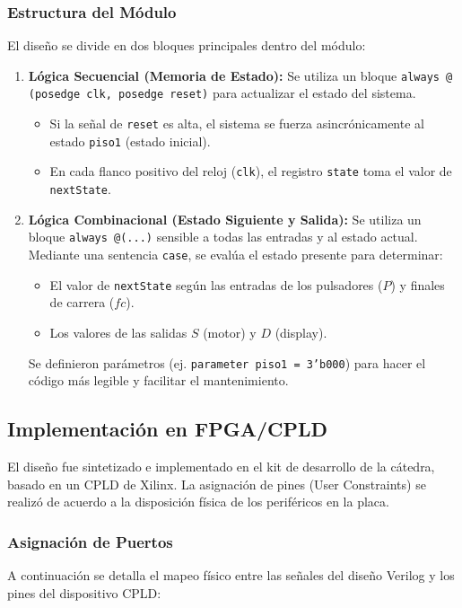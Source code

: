 \subsubsection{Estructura del Módulo}
El diseño se divide en dos bloques principales dentro del módulo:

\begin{enumerate}
    \item \textbf{Lógica Secuencial (Memoria de Estado):}
    Se utiliza un bloque \texttt{always @ (posedge clk, posedge reset)} para actualizar el estado del sistema.
    \begin{itemize}
        \item Si la señal de \texttt{reset} es alta, el sistema se fuerza asincrónicamente al estado \texttt{piso1} (estado inicial).
        \item En cada flanco positivo del reloj (\texttt{clk}), el registro \texttt{state} toma el valor de \texttt{nextState}.
    \end{itemize}

    \item \textbf{Lógica Combinacional (Estado Siguiente y Salida):}
    Se utiliza un bloque \texttt{always @(...)} sensible a todas las entradas y al estado actual. Mediante una sentencia \texttt{case}, se evalúa el estado presente para determinar:
    \begin{itemize}
        \item El valor de \texttt{nextState} según las entradas de los pulsadores ($P$) y finales de carrera ($fc$).
        \item Los valores de las salidas $S$ (motor) y $D$ (display).
    \end{itemize}
    Se definieron parámetros (ej. \texttt{parameter piso1 = 3'b000}) para hacer el código más legible y facilitar el mantenimiento.
\end{enumerate}

\subsection{Implementación en FPGA/CPLD}
El diseño fue sintetizado e implementado en el kit de desarrollo de la cátedra, basado en un CPLD de Xilinx. La asignación de pines (User Constraints) se realizó de acuerdo a la disposición física de los periféricos en la placa.


\subsubsection{Asignación de Puertos}
A continuación se detalla el mapeo físico entre las señales del diseño Verilog y los pines del dispositivo CPLD:

